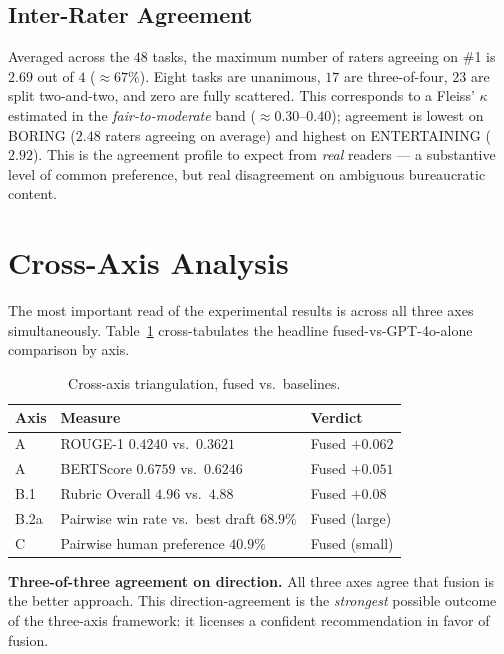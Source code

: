 \subsection{Inter-Rater Agreement}

Averaged across the $48$ tasks, the maximum number of raters agreeing
on \#1 is $2.69$ out of $4$ ($\approx 67\%$). Eight tasks are
unanimous, $17$ are three-of-four, $23$ are split two-and-two, and
zero are fully scattered. This corresponds to a Fleiss' $\kappa$
estimated in the \textit{fair-to-moderate} band ($\approx 0.30$--$0.40$);
agreement is lowest on BORING ($2.48$ raters agreeing on average) and
highest on ENTERTAINING ($2.92$). This is the agreement profile to
expect from \textit{real} readers --- a substantive level of common
preference, but real disagreement on ambiguous bureaucratic content.

\section{Cross-Axis Analysis}

The most important read of the experimental results is across all
three axes simultaneously. Table~\ref{tab:cross-axis} cross-tabulates
the headline fused-vs-GPT-4o-alone comparison by axis.

\begin{table}[H]
  \centering
  \caption{Cross-axis triangulation, fused vs.\ baselines.}
  \label{tab:cross-axis}
  \begin{tabular}{lll}
    \toprule
    Axis & Measure & Verdict \\
    \midrule
    A   & ROUGE-1 $0.4240$ vs.\ $0.3621$        & Fused $+0.062$ \\
    A   & BERTScore $0.6759$ vs.\ $0.6246$      & Fused $+0.051$ \\
    B.1 & Rubric Overall $4.96$ vs.\ $4.88$     & Fused $+0.08$ \\
    B.2a & Pairwise win rate vs.\ best draft $68.9\%$ & Fused (large) \\
    C   & Pairwise human preference $40.9\%$      & Fused (small) \\
    \bottomrule
  \end{tabular}
\end{table}

\textbf{Three-of-three agreement on direction.} All three axes agree
that fusion is the better approach. This direction-agreement is the
\textit{strongest} possible outcome of the three-axis framework: it
licenses a confident recommendation in favor of fusion.

